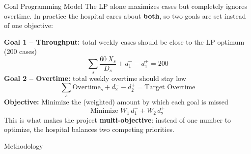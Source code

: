 \documentclass[aspectratio=169]{beamer}
\begin{document}
\begin{frame}{Goal Programming Model}
    The LP alone maximizes cases but completely ignores overtime. In practice
    the hospital cares about \textbf{both}, so two goals are set instead of
    one objective:

    \vspace{6pt}
    \textbf{Goal 1 -- Throughput:} total weekly cases should be close to the
    LP optimum (200 cases)
    \[
        \sum_{s} \frac{60\, X_s}{D_s} + d_1^- - d_1^+ = 200
    \]
    \textbf{Goal 2 -- Overtime:} total weekly overtime should stay low
    \[
        \sum_{s} \text{Overtime}_s + d_2^- - d_2^+ = \text{Target Overtime}
    \]
    \textbf{Objective:} Minimize the (weighted) amount by which each goal is missed
    \[
        \text{Minimize } W_1\, d_1^- + W_2\, d_2^+
    \]
    This is what makes the project \textbf{multi-objective}: instead of one
    number to optimize, the hospital balances two competing priorities.
\end{frame}

\begin{frame}{Methodology}
    \centering
\end{frame}
\end{document}
